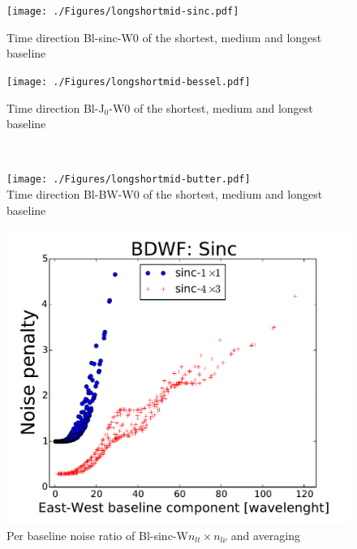 \documentclass[useAMS,usenatbib]{mn2e}
\begin{document}
\begin{figure}
 \centering
  \begin{minipage}{0.38\linewidth}\texttt{[image: ./Figures/longshortmid-sinc.pdf]}
  \caption{Time direction Bl-sinc-W0 of the shortest, medium and longest baseline}\label{fig:longshortmid-sinc}
  \end{minipage}
  \hspace{1cm}
  \begin{minipage}{0.38\linewidth}\texttt{[image: ./Figures/longshortmid-bessel.pdf]}
  \caption{Time direction Bl-J$_0$-W0 of the shortest, medium and longest baseline}\label{fig:longshortmid-bessel}
  \end{minipage}\\
  \begin{minipage}{0.38\linewidth}\texttt{[image: ./Figures/longshortmid-butter.pdf]}\\
  \caption{Time direction Bl-BW-W0 of the shortest, medium and longest baseline}\label{fig:longshortmid-butter}
  \end{minipage}
    \begin{minipage}{0.38\linewidth}\includegraphics[width=1\textwidth]{./Figures/per-baseline-noise-ratio-sinc.pdf}
  \caption{Per baseline noise ratio of Bl-sinc-W$n_{lt}\times n_{l\nu}$ and averaging}\label{fig:per-baseline-noise-ratio-sinc}
  \end{minipage}

\end{figure}
\end{document}
